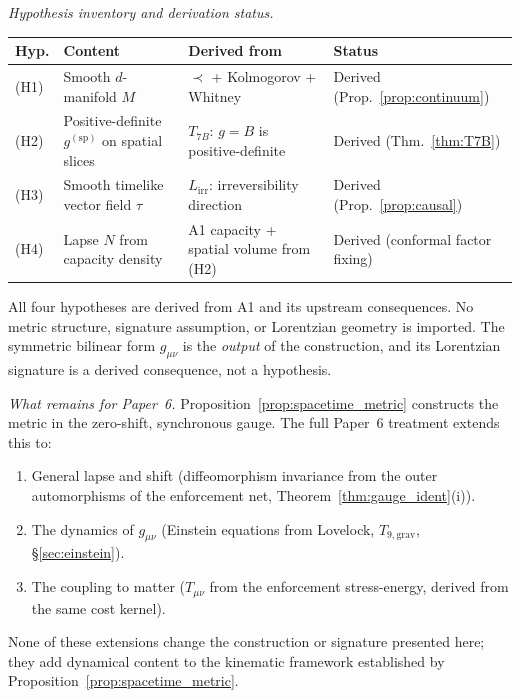 \documentclass[11pt,a4paper]{article}
\theoremstyle{definition}
\begin{document}
\smallskip\noindent\textit{Hypothesis inventory and derivation
status.}\quad

\begin{center}\small
\renewcommand{\arraystretch}{1.15}
\begin{tabular}{@{}p{1.0cm}p{4.0cm}p{3.0cm}p{4.0cm}@{}}
\toprule
\textbf{Hyp.} & \textbf{Content} & \textbf{Derived from} &
  \textbf{Status} \\
\midrule
(H1) & Smooth $d$-manifold $M$ &
  $\prec$ + Kolmogorov + Whitney &
  Derived (Prop.~\ref{prop:continuum}) \\
(H2) & Positive-definite $g^{(\mathrm{sp})}$ on spatial slices &
  $T_{7B}$: $g = B$ is positive-definite &
  Derived (Thm.~\ref{thm:T7B}) \\
(H3) & Smooth timelike vector field $\tau$ &
  $L_{\mathrm{irr}}$: irreversibility direction &
  Derived (Prop.~\ref{prop:causal}) \\
(H4) & Lapse $N$ from capacity density &
  A1 capacity + spatial volume from (H2) &
  Derived (conformal factor fixing) \\
\bottomrule
\end{tabular}
\end{center}

\noindent All four hypotheses are derived from A1 and its upstream
consequences.  No metric structure, signature assumption, or
Lorentzian geometry is imported.  The symmetric bilinear form
$g_{\mu\nu}$ is the \emph{output} of the construction, and its
Lorentzian signature is a derived consequence, not a hypothesis.

\smallskip\noindent\textit{What remains for Paper~6.}\quad
Proposition~\ref{prop:spacetime_metric} constructs the metric in the
zero-shift, synchronous gauge.  The full Paper~6 treatment extends
this to:
\begin{enumerate}[label=(\alph*),nosep]
  \item General lapse and shift (diffeomorphism invariance from the
  outer automorphisms of the enforcement net,
  Theorem~\ref{thm:gauge_ident}(i)).
  \item The dynamics of $g_{\mu\nu}$ (Einstein equations from
  Lovelock, $T_{9,\mathrm{grav}}$, \S\ref{sec:einstein}).
  \item The coupling to matter ($T_{\mu\nu}$ from the enforcement
  stress-energy, derived from the same cost kernel).
\end{enumerate}
None of these extensions change the construction or signature
presented here; they add dynamical content to the kinematic framework
established by Proposition~\ref{prop:spacetime_metric}.
\end{document}
